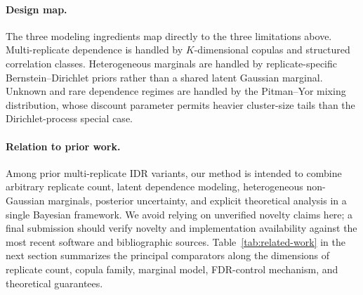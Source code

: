 \paragraph{Design map.}
The three modeling ingredients map directly to the three limitations above. Multi-replicate dependence is handled by $K$-dimensional copulas and structured correlation classes. Heterogeneous marginals are handled by replicate-specific Bernstein--Dirichlet priors rather than a shared latent Gaussian marginal. Unknown and rare dependence regimes are handled by the Pitman--Yor mixing distribution, whose discount parameter permits heavier cluster-size tails than the Dirichlet-process special case.

\paragraph{Relation to prior work.}
Among prior multi-replicate IDR variants, our method is intended to combine arbitrary replicate count, latent dependence modeling, heterogeneous non-Gaussian marginals, posterior uncertainty, and explicit theoretical analysis in a single Bayesian framework. We avoid relying on unverified novelty claims here; a final submission should verify novelty and implementation availability against the most recent software and bibliographic sources. Table~\ref{tab:related-work} in the next section summarizes the principal comparators along the dimensions of replicate count, copula family, marginal model, FDR-control mechanism, and theoretical guarantees.
